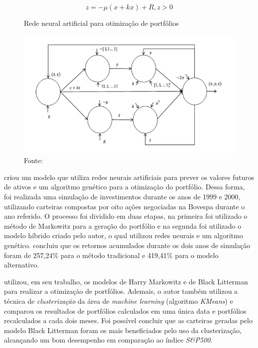 \documentclass[11pt]{article}
\begin{document}
    \begin{equation} \label{nn3}
        z = -\mu(x + kx) + R, z > 0 
    \end{equation}
    
    \begin{figure}[H]
        \centering
        \caption{Rede neural artificial para otimização de portfólios}
        \includegraphics[scale=.5]{figuras/nn_portfolio.png}
        \caption*{Fonte: }
        \label{fig:nn}
    \end{figure}
    
    
     criou um modelo que utiliza redes neurais artificiais para prever os valores futuros de ativos e um algoritmo genético para a otimização do portfólio. Dessa forma, foi realizada uma simulação de investimentos durante os anos de 1999 e 2000, utilizando carteiras compostas por oito ações negociadas na Bovespa durante o ano referido. O processo foi dividido em duas etapas, na primeira foi utilizado o método de Markowitz para a geração do portfólio e na segunda foi utilizado o modelo híbrido criado pelo autor, o qual utilizou redes neurais e um algoritmo genético.  concluiu que os retornos acumulados durante os dois anos de simulação foram de 257,24\% para o método tradicional e 419,41\% para o modelo alternativo. 
    
     utilizou, em seu trabalho, os modelos de Harry Markowitz e de Black Litterman para realizar a otimização de portfólios. Ademais, o autor também utilizou a técnica de \textit{clusterização} da área de \textit{machine learning} (algoritmo \textit{KMeans}) e comparou os resultados de portfólios calculados em uma única data e portfólios recalculados a cada dois meses. Foi possível concluir que as carteiras geradas pelo modelo Black Litterman foram os mais beneficiados pelo uso da clusterização, alcançando um bom desempenho em comparação ao índice \textit{S\&P500}.
    
\end{document}
